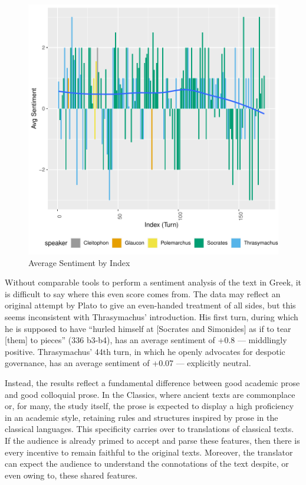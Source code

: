 \documentclass[noraggedright]{turabian-researchpaper}
\begin{document}
\begin{figure}[htbp]
\includegraphics{GreatFlood-Figure: Turn Sen}
\caption{Average Sentiment by Index}
\label{fig:SenPlot}
\end{figure}

Without comparable tools to perform a sentiment analysis of the text in Greek, it is difficult to say where this even score comes from. The data may reflect an original attempt by Plato to give an even-handed treatment of all sides, but this seems inconsistent with Thrasymachus' introduction. His first turn, during which he is supposed to have ``hurled himself at [Socrates and Simonides] as if to tear [them] to pieces'' (336 b3-b4), has an average sentiment of +0.8 — middlingly positive. Thrasymachus' 44th turn, in which he openly advocates for despotic governance, has an average sentiment of +0.07 — explicitly neutral. 

Instead, the results reflect a fundamental difference between good academic prose and good colloquial prose. In the Classics, where ancient texts are commonplace or, for many, the study itself, the prose is expected to display a high proficiency in an academic style, retaining rules and structures inspired by prose in the classical languages. This specificity carries over to translations of classical texts. If the audience is already primed to accept and parse these features, then there is every incentive to remain faithful to the original texts. Moreover, the translator can expect the audience to understand the connotations of the text despite, or even owing to, these shared features.
\end{document}
